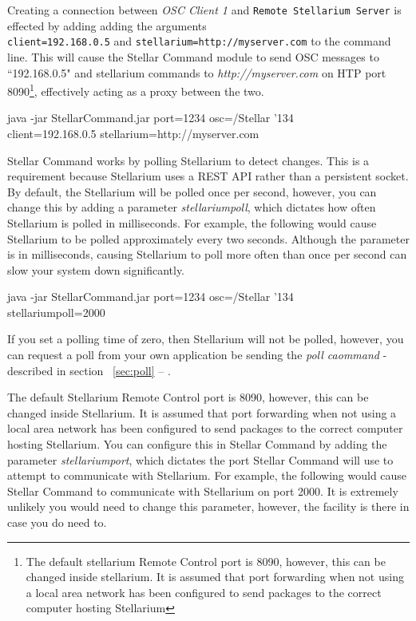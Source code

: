 Creating a connection between \textit{OSC Client 1} and \texttt{Remote Stellarium Server} is effected by adding adding the arguments \\\texttt{client=192.168.0.5} and \texttt{stellarium=http://myserver.com} to the command line.
This will cause the Stellar Command module to send OSC messages to ``192.168.0.5" and stellarium commands to \textit{http://myserver.com} on HTP port 8090\footnote{The default stellarium Remote Control port is 8090, however, this can be changed inside stellarium. It is assumed that port forwarding when not using a local area network has been configured to send packages to the correct computer hosting Stellarium}, effectively acting as a proxy between the two.

 \begin{syntax} 
	\medskip
	java -jar StellarCommand.jar port=1234 osc=/Stellar  {\char'134}\\client=192.168.0.5 stellarium=http://myserver.com\\
	\medskip
\end{syntax}
\bigskip

 
Stellar Command works by polling Stellarium to detect changes. This is a requirement because Stellarium uses a REST API rather than a persistent socket. By default, the Stellarium will be polled once per second, however, you can change this by adding a parameter \textit{stellariumpoll}, which dictates how often Stellarium is polled in milliseconds. For example, the following would cause Stellarium to be polled approximately  every two seconds. Although the parameter is in milliseconds, causing Stellarium to poll more often than once per second can slow your system down significantly. 

 \begin{syntax} 
	\medskip
	java -jar StellarCommand.jar port=1234 osc=/Stellar  {\char'134}\\stellariumpoll=2000 
	\medskip
\end{syntax}
\bigskip
If you set a polling time of zero, then Stellarium will not be polled, however, you can request a poll from your own application be sending the \textit{poll caommand} - described in section ~\ref{sec:poll} --
\emph{}.


The default Stellarium Remote Control port is 8090, however, this can be changed inside Stellarium. It is assumed that port forwarding when not using a local area network has been configured to send packages to the correct computer hosting Stellarium. You can configure this in Stellar Command by adding the parameter \textit{stellariumport}, which dictates the port Stellar Command will use to attempt to communicate with Stellarium. For example, the following would cause Stellar Command to communicate with Stellarium on port 2000. It is extremely unlikely you would need to change this parameter, however, the facility is there in case you do need to.   

